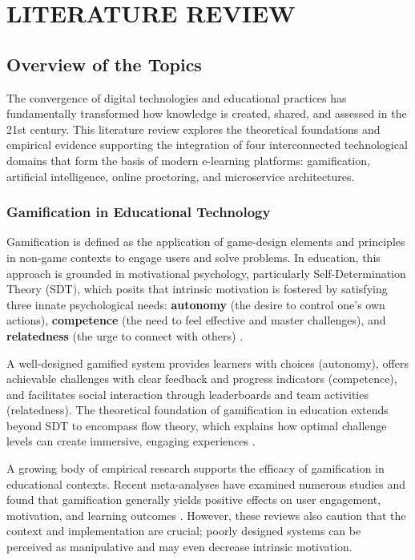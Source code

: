 \chapter{LITERATURE REVIEW}
\label{chap:lit-review}

\section{Overview of the Topics}
\label{sec:lit-overview}

The convergence of digital technologies and educational practices has fundamentally transformed how knowledge is created, shared, and assessed in the 21st century. This literature review explores the theoretical foundations and empirical evidence supporting the integration of four interconnected technological domains that form the basis of modern e-learning platforms: gamification, artificial intelligence, online proctoring, and microservice architectures.

\subsection{Gamification in Educational Technology}

Gamification is defined as the application of game-design elements and principles in non-game contexts to engage users and solve problems. In education, this approach is grounded in motivational psychology, particularly Self-Determination Theory (SDT), which posits that intrinsic motivation is fostered by satisfying three innate psychological needs: \textbf{autonomy} (the desire to control one's own actions), \textbf{competence} (the need to feel effective and master challenges), and \textbf{relatedness} (the urge to connect with others) \citep{oliveira2023}.

A well-designed gamified system provides learners with choices (autonomy), offers achievable challenges with clear feedback and progress indicators (competence), and facilitates social interaction through leaderboards and team activities (relatedness). The theoretical foundation of gamification in education extends beyond SDT to encompass flow theory, which explains how optimal challenge levels can create immersive, engaging experiences \citep{oliveira2023}.

A growing body of empirical research supports the efficacy of gamification in educational contexts. Recent meta-analyses have examined numerous studies and found that gamification generally yields positive effects on user engagement, motivation, and learning outcomes \citep{oliveira2023}. However, these reviews also caution that the context and implementation are crucial; poorly designed systems can be perceived as manipulative and may even decrease intrinsic motivation.

